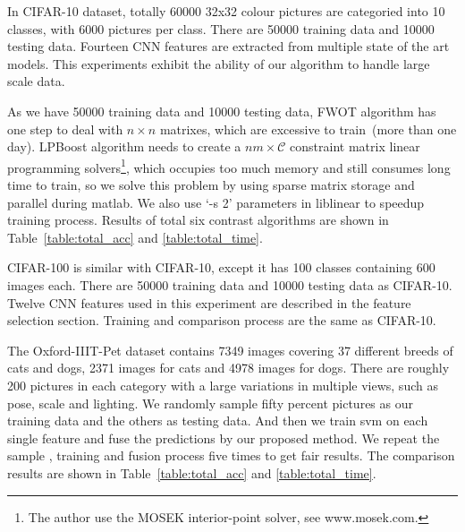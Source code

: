 \documentclass[letterpaper]{article}
\def\calC{{\mathcal{C}}}
\begin{document}

In CIFAR-10 dataset, totally 60000 32x32 colour pictures are categoried into 10 classes, with 6000 pictures per class.
There are 50000 training data and 10000 testing data.
Fourteen CNN features are extracted from multiple state of the art models.
This experiments exhibit the ability of our algorithm to handle large scale data.

As we have 50000 training data and 10000 testing data,
FWOT algorithm has one step to deal with $n\times n$ matrixes, which are excessive to train~(more than one day).
LPBoost algorithm needs to create a $nm\times \calC$ constraint matrix linear programming solvers\footnote{The author use the MOSEK interior-point solver, see www.mosek.com.},
which occupies too much memory and still consumes long time to train, so we solve this problem by using sparse matrix storage and parallel during matlab.
We also use `-s 2' parameters in liblinear to speedup training process. Results of total six contrast algorithms are shown in Table~\ref{table:total_acc} and \ref{table:total_time}.



CIFAR-100 is similar with CIFAR-10, except it has 100 classes containing 600 images each.
There are 50000 training data and 10000 testing data as CIFAR-10.
Twelve CNN features used in this experiment are described in the feature selection section.
Training and comparison process are the same as CIFAR-10.




The Oxford-IIIT-Pet dataset contains 7349 images covering 37 different breeds of cats and dogs, 2371 images for cats and 4978 images for dogs.
There are roughly 200 pictures in each category with a large variations in multiple views, such as pose, scale and lighting.
We randomly sample fifty percent pictures as our training data and the others as testing data.
And then we train svm on each single feature and fuse the predictions by our proposed method.
We repeat the sample , training and fusion process five times to get fair results.
The comparison results are shown in Table~\ref{table:total_acc} and \ref{table:total_time}.
\end{document}

